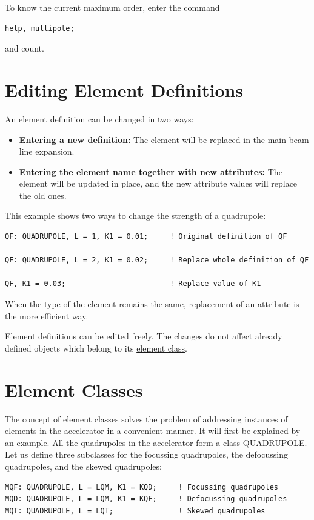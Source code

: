 To know the current maximum order, enter the command 
\begin{verbatim}
help, multipole;
\end{verbatim} 
and count. 


%
\section{Editing Element Definitions}  
An element definition can be changed in two ways: 
\begin{itemize}
   \item \textbf{Entering a new definition:} The element will be
     replaced in the main beam line expansion.  
   \item \textbf{Entering the element name together with new
     attributes:} The element will be updated in place, and the new
     attribute values will replace the old ones.  
\end{itemize} 

This example shows two ways to change the strength of a quadrupole: 
\begin{verbatim}
QF: QUADRUPOLE, L = 1, K1 = 0.01;     ! Original definition of QF

QF: QUADRUPOLE, L = 2, K1 = 0.02;     ! Replace whole definition of QF

QF, K1 = 0.03;                        ! Replace value of K1
\end{verbatim} 

When the type of the element remains the same, replacement of an
attribute is the more efficient way.  

Element definitions can be edited freely. The changes do not affect
already defined objects which belong to its
\href{elm_class.html}{element class}.  



%
\section{Element Classes}  
\label{sec:element_classes}
The concept of element classes solves the problem of addressing
instances of elements in the accelerator in a convenient manner. It will
first be explained by an example. All the quadrupoles in the accelerator
form a class QUADRUPOLE. Let us define three subclasses for the
focussing quadrupoles, the defocussing quadrupoles, and the skewed
quadrupoles:  
\begin{verbatim}
MQF: QUADRUPOLE, L = LQM, K1 = KQD;     ! Focussing quadrupoles
MQD: QUADRUPOLE, L = LQM, K1 = KQF;     ! Defocussing quadrupoles
MQT: QUADRUPOLE, L = LQT;               ! Skewed quadrupoles
\end{verbatim} 

